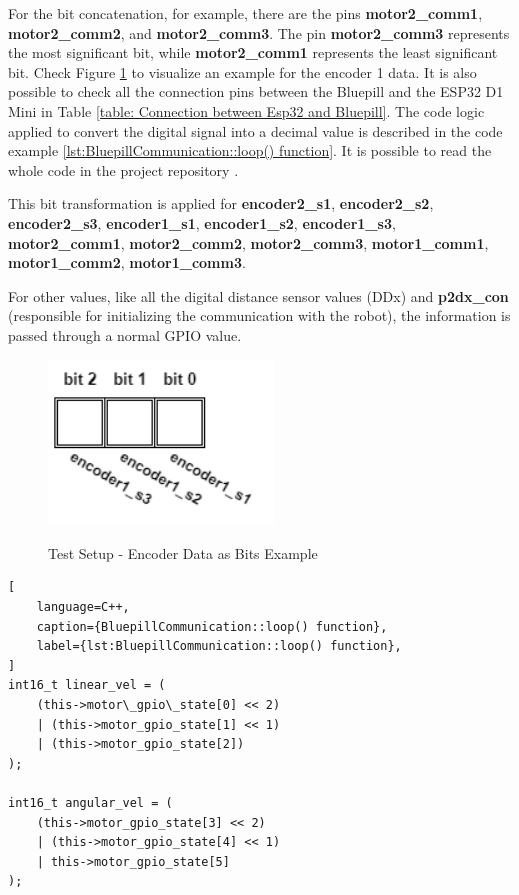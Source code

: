 \documentclass[../../monografia.tex]{subfiles}
\begin{document}
For the bit concatenation, for example, there are the pins \textbf{motor2\_comm1}, \textbf{motor2\_comm2}, and \textbf{motor2\_comm3}. The pin \textbf{motor2\_comm3} represents the most significant bit, while \textbf{motor2\_comm1} represents the least significant bit. Check Figure \ref{fig: Test Setup - Encoder Data as Bits Example} to visualize an example for the encoder 1 data. It is also possible to check all the connection pins between the Bluepill and the ESP32 D1 Mini in Table \ref{table: Connection between Esp32 and Bluepill}. The code logic applied to convert the digital signal into a decimal value is described in the code example \ref{lst:BluepillCommunication::loop() function}. It is possible to read the whole code in the project repository \cite{pioneer_2dx_interface_esp32_2024}.

This bit transformation is applied for \textbf{encoder2\_s1}, \textbf{encoder2\_s2}, \textbf{encoder2\_s3}, \textbf{encoder1\_s1}, \textbf{encoder1\_s2}, \textbf{encoder1\_s3}, \textbf{motor2\_comm1}, \textbf{motor2\_comm2}, \textbf{motor2\_comm3}, \textbf{motor1\_comm1}, \textbf{motor1\_comm2}, \textbf{motor1\_comm3}.

For other values, like all the digital distance sensor values (DDx) and \textbf{p2dx\_con} (responsible for initializing the communication with the robot), the information is passed through a normal GPIO value.

\begin{figure}[h!]
    \caption{Test Setup - Encoder Data as Bits Example}
    \centering
    \includegraphics[width=6cm]{diagramas-test_setup-pioneer_2dx_interface-bluepill.drawio.png}
    \label{fig: Test Setup - Encoder Data as Bits Example}
\end{figure}


\begin{lstlisting}[
    language=C++,
    caption={BluepillCommunication::loop() function},
    label={lst:BluepillCommunication::loop() function},
]
int16_t linear_vel = (
    (this->motor\_gpio\_state[0] << 2)
    | (this->motor_gpio_state[1] << 1)
    | (this->motor_gpio_state[2])
);

int16_t angular_vel = (
    (this->motor_gpio_state[3] << 2) 
    | (this->motor_gpio_state[4] << 1) 
    | this->motor_gpio_state[5]
);
\end{lstlisting}
\end{document}
